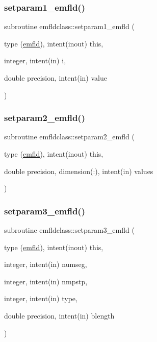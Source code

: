 \subsubsection{\texorpdfstring{setparam1\_emfld()}{setparam1\_emfld()}}
{\footnotesize\ttfamily subroutine emfldclass\+::setparam1\+\_\+emfld (\begin{DoxyParamCaption}\item[{type (\mbox{\hyperlink{namespaceemfldclass_structemfldclass_1_1emfld}{emfld}}), intent(inout)}]{this,  }\item[{integer, intent(in)}]{i,  }\item[{double precision, intent(in)}]{value }\end{DoxyParamCaption})}

\mbox{\label{namespaceemfldclass_ad425987a9a6e1cb7b0b2b7b1724dc961}} 
\subsubsection{\texorpdfstring{setparam2\_emfld()}{setparam2\_emfld()}}
{\footnotesize\ttfamily subroutine emfldclass\+::setparam2\+\_\+emfld (\begin{DoxyParamCaption}\item[{type (\mbox{\hyperlink{namespaceemfldclass_structemfldclass_1_1emfld}{emfld}}), intent(inout)}]{this,  }\item[{double precision, dimension(\+:), intent(in)}]{values }\end{DoxyParamCaption})}

\mbox{\label{namespaceemfldclass_a3f40c1b18d4a7a28ceea11a3a6b350ad}} 
\subsubsection{\texorpdfstring{setparam3\_emfld()}{setparam3\_emfld()}}
{\footnotesize\ttfamily subroutine emfldclass\+::setparam3\+\_\+emfld (\begin{DoxyParamCaption}\item[{type (\mbox{\hyperlink{namespaceemfldclass_structemfldclass_1_1emfld}{emfld}}), intent(inout)}]{this,  }\item[{integer, intent(in)}]{numseg,  }\item[{integer, intent(in)}]{nmpstp,  }\item[{integer, intent(in)}]{type,  }\item[{double precision, intent(in)}]{blength }\end{DoxyParamCaption})}



